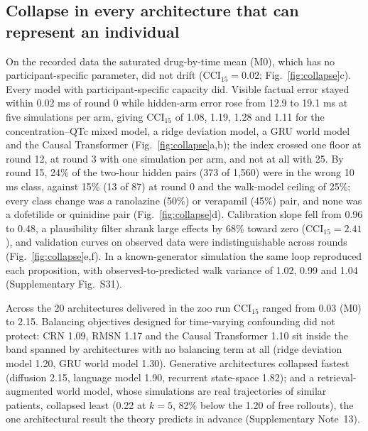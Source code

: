 \documentclass[11pt,a4paper]{article}
\newcommand{\CCI}{\mathrm{CCI}}
\begin{document}
\subsection{Collapse in every architecture that can represent an individual}
On the recorded data the saturated drug-by-time mean (M0), which has no participant-specific parameter, did not drift ($\CCI_{15}=0.02$; Fig.~\ref{fig:collapse}c). Every model with participant-specific capacity did. Visible factual error stayed within 0.02 ms of round 0 while hidden-arm error rose from 12.9 to 19.1 ms at five simulations per arm, giving $\CCI_{15}$ of 1.08, 1.19, 1.28 and 1.11 for the concentration--QTc mixed model, a ridge deviation model, a GRU world model and the Causal Transformer (Fig.~\ref{fig:collapse}a,b); the index crossed one floor at round 12, at round 3 with one simulation per arm, and not at all with 25. By round 15, 24\% of the two-hour hidden pairs (373 of 1,560) were in the wrong 10 ms class, against 15\% (13 of 87) at round 0 and the walk-model ceiling of 25\%; every class change was a ranolazine (50\%) or verapamil (45\%) pair, and none was a dofetilide or quinidine pair (Fig.~\ref{fig:collapse}d). Calibration slope fell from 0.96 to 0.48, a plausibility filter shrank large effects by 68\% toward zero ($\CCI_{15}=2.41$), and validation curves on observed data were indistinguishable across rounds (Fig.~\ref{fig:collapse}e,f). In a known-generator simulation the same loop reproduced each proposition, with observed-to-predicted walk variance of 1.02, 0.99 and 1.04 (Supplementary Fig.~S31).

Across the 20 architectures delivered in the zoo run $\CCI_{15}$ ranged from 0.03 (M0) to 2.15. Balancing objectives designed for time-varying confounding did not protect: CRN 1.09, RMSN 1.17 and the Causal Transformer 1.10 sit inside the band spanned by architectures with no balancing term at all (ridge deviation model 1.20, GRU world model 1.30)\cite{lim2018rmsn,bica2020crn,causaltransformer2022}. Generative architectures collapsed fastest (diffusion 2.15, language model 1.90, recurrent state-space 1.82)\cite{tashiro2021csdi,hafner2025dreamer}; and a retrieval-augmented world model, whose simulations are real trajectories of similar patients, collapsed least (0.22 at $k=5$, 82\% below the 1.20 of free rollouts), the one architectural result the theory predicts in advance (Supplementary Note~13).
\end{document}
